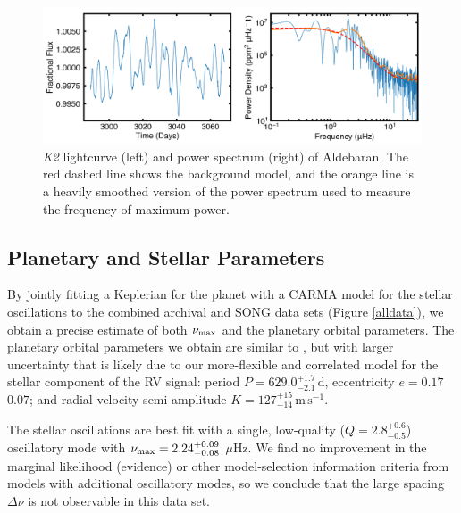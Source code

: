 \documentclass[modern]{aastex61}
\newcommand{\numax}{\mbox{$\nu_{\rm max}$}\xspace}
\newcommand{\muHz}{\mbox{$\mu$Hz}\xspace}
\newcommand{\ktwo}{\emph{K2}\xspace}
\newcommand{\twosidedrange}[3]{\ensuremath{#1^{+#2}_{-#3}}}
\newcommand{\CombinedQRange}{\twosidedrange{2.8}{0.6}{0.5}}
\newcommand{\PeriodRange}{\twosidedrange{629.0}{1.7}{2.1}}
\newcommand{\EccentricityRange}{0.17$\pm$0.07} %
\newcommand{\PlanetRVAmpRange}{\twosidedrange{127}{15}{14}}
\begin{document}
\begin{figure}
\centering
\includegraphics[width=\textwidth]{k2obs.png}
\caption{\ktwo lightcurve (left) and power spectrum (right) of Aldebaran. The red dashed line shows the background model, and the orange line is a heavily smoothed version of the power spectrum used to measure the frequency of maximum power. }
\label{k2_lightcurve}
\end{figure}

\subsection{Planetary and Stellar Parameters}
\label{sec:planet-star-parameters}

By jointly fitting a Keplerian for the planet with a CARMA model for the stellar
oscillations to the combined archival and SONG data sets (Figure \ref{alldata}),
we obtain a precise estimate of both \numax and the planetary orbital
parameters. The planetary orbital parameters we obtain are similar to
\citet{Hatzes2015}, but with larger uncertainty that is likely due to our
more-flexible and correlated model for the stellar component of the RV signal:
period $P = \PeriodRange \, \mathrm{d}$, eccentricity $e =
\EccentricityRange{}$; and radial velocity semi-amplitude $K =
\PlanetRVAmpRange{} \, \mathrm{m} \, \mathrm{s}^{-1}$.

The stellar oscillations are best fit with a single, low-quality ($Q =
\CombinedQRange{}$) oscillatory mode with $\numax = 2.24^{+ 0.09}_{- 0.08}$
\muHz.  We find no improvement in the marginal likelihood (evidence) or other
model-selection information criteria \citep{Gelman2013} from models with
additional oscillatory modes, so we conclude that the large spacing $\Delta\nu$
is not observable in this data set.  
\end{document}
